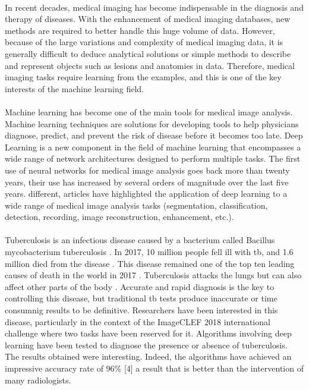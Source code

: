 \paragraph{}
In recent decades, medical imaging has become indispensable in the diagnosis and therapy of diseases. With the enhancement of medical imaging databases, new methods are required to better handle this huge volume of data. However, because of the large variations and complexity of medical imaging data, it is generally difficult to deduce analytical solutions or simple methods to describe and represent objects such as lesions and anatomies in data. Therefore, medical imaging tasks require learning from the examples, and this is one of the key interests of the machine learning field.
\paragraph{}
Machine learning has become one of the main tools for medical image analysis. Machine learning techniques are solutions for developing tools to help physicians diagnose, predict, and prevent the risk of disease before it becomes too late. Deep Learning is a new component in the field of machine learning that encompasses a wide range of network architectures designed to perform multiple tasks. The first use of neural networks for medical image analysis goes back more than twenty years, their use has increased by several orders of magnitude over the last five years. different, articles \cite{NNMEEX:1,NNMEEX:2,NNMEEX:3,NNMEEX:4,NNMEEX:5} have highlighted the application of deep learning to a wide range of medical image analysis tasks (segmentation, classification, detection, recording, image reconstruction, enhancement, etc.).
\paragraph{}
Tuberculosis is an infectious disease caused by a bacterium called Bacillus mycobacterium tuberculosis \cite{TBT:1}. In 2017, 10 million people fell ill with \ac{tb}, and 1.6 million died from the disease \cite{TBT:1}. This disease remained one of the top ten leading causes of death in the world in 2017 \cite{TBT:1}. Tuberculosis attacks the lungs but can also affect other parts of the body \cite{TBT:2}. Accurate and rapid diagnosis is the key to controlling this disease, but traditional \ac{tb} tests produce inaccurate or time consumnig results to be definitive. Researchers have been interested in this disease, particularly in the context of the ImageCLEF 2018\cite{ImageCLEF:1} international challenge \cite{ImageCLEF:1} where two tasks have been reserved for it. Algorithms involving deep learning have been tested to diagnose the presence or absence of tuberculosis. The results obtained were interesting. Indeed, the algorithms have achieved an impressive accuracy rate of 96\% [4] a result that is better than the intervention of many radiologists.
